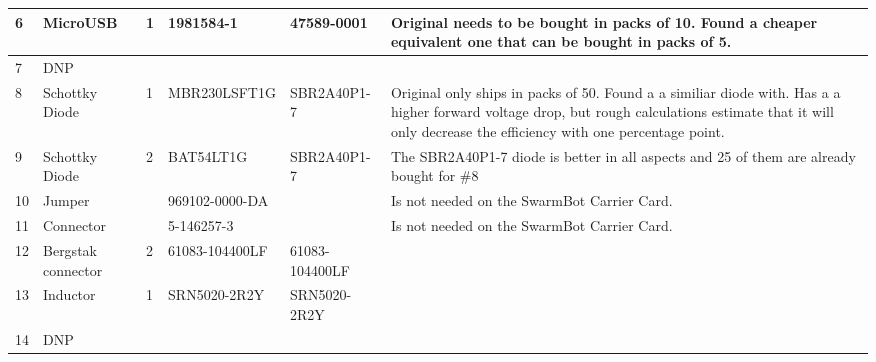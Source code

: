 \begin{sidewaystable}
\begin{tabular}{|p{0.5cm}|p{2cm}|p{1.5cm}|l|l|p{5cm}|}
6       & MicroUSB               & 1        & 1981584-1             & 47589-0001            & Original needs to be bought in packs of 10. Found a cheaper equivalent one that can be bought in packs of 5.                                                                                                 \\ \hline
7       & DNP                    &          &                       &                       &                                                                                                                                                                                                              \\ \hline
8       & Schottky Diode         & 1        & MBR230LSFT1G          & SBR2A40P1-7           & Original only ships in packs of 50. Found a a similiar diode with. Has a a higher forward voltage drop, but rough calculations estimate that it will only decrease the efficiency with one percentage point. \\ \hline
9       & Schottky Diode         & 2        & BAT54LT1G             & SBR2A40P1-7           & The SBR2A40P1-7 diode is better in all aspects and 25 of them are already bought for \#8                                                                                                                     \\ \hline
10      & Jumper                 &          & 969102-0000-DA        &                       & Is not needed on the SwarmBot Carrier Card.                                                                                                                                                                  \\ \hline
11      & Connector              &          & 5-146257-3            &                       & Is not needed on the SwarmBot Carrier Card.                                                                                                                                                                  \\ \hline
12      & Bergstak connector     & 2        & 61083-104400LF        & 61083-104400LF        &                                                                                                                                                                                                              \\ \hline
13      & Inductor               & 1        & SRN5020-2R2Y          & SRN5020-2R2Y          &                                                                                                                                                                                                              \\ \hline
14      & DNP                    &          &                       &                       &                                                                                                                                                                                                              \\ \hline
\end{tabular}	
\end{sidewaystable}

